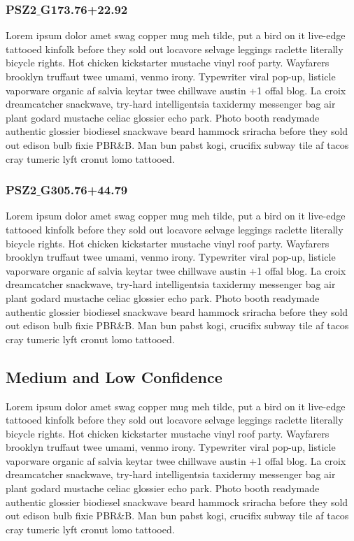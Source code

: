 \documentclass[apj, revtex4]{emulateapj}
\begin{document}
\subsubsection{PSZ2$\_$G173.76+22.92}

Lorem ipsum dolor amet swag copper mug meh tilde, put a bird on it live-edge tattooed kinfolk before they sold out locavore selvage leggings raclette literally bicycle rights. Hot chicken kickstarter mustache vinyl roof party. Wayfarers brooklyn truffaut twee umami, venmo irony. Typewriter viral pop-up, listicle vaporware organic af salvia keytar twee chillwave austin +1 offal blog. La croix dreamcatcher snackwave, try-hard intelligentsia taxidermy messenger bag air plant godard mustache celiac glossier echo park. Photo booth readymade authentic glossier biodiesel snackwave beard hammock sriracha before they sold out edison bulb fixie PBR\&B. Man bun pabst kogi, crucifix subway tile af tacos cray tumeric lyft cronut lomo tattooed.


\subsubsection{PSZ2$\_$G305.76+44.79}

Lorem ipsum dolor amet swag copper mug meh tilde, put a bird on it live-edge tattooed kinfolk before they sold out locavore selvage leggings raclette literally bicycle rights. Hot chicken kickstarter mustache vinyl roof party. Wayfarers brooklyn truffaut twee umami, venmo irony. Typewriter viral pop-up, listicle vaporware organic af salvia keytar twee chillwave austin +1 offal blog. La croix dreamcatcher snackwave, try-hard intelligentsia taxidermy messenger bag air plant godard mustache celiac glossier echo park. Photo booth readymade authentic glossier biodiesel snackwave beard hammock sriracha before they sold out edison bulb fixie PBR\&B. Man bun pabst kogi, crucifix subway tile af tacos cray tumeric lyft cronut lomo tattooed.


\subsection{Medium and Low Confidence}

Lorem ipsum dolor amet swag copper mug meh tilde, put a bird on it live-edge tattooed kinfolk before they sold out locavore selvage leggings raclette literally bicycle rights. Hot chicken kickstarter mustache vinyl roof party. Wayfarers brooklyn truffaut twee umami, venmo irony. Typewriter viral pop-up, listicle vaporware organic af salvia keytar twee chillwave austin +1 offal blog. La croix dreamcatcher snackwave, try-hard intelligentsia taxidermy messenger bag air plant godard mustache celiac glossier echo park. Photo booth readymade authentic glossier biodiesel snackwave beard hammock sriracha before they sold out edison bulb fixie PBR\&B. Man bun pabst kogi, crucifix subway tile af tacos cray tumeric lyft cronut lomo tattooed.
\end{document}
